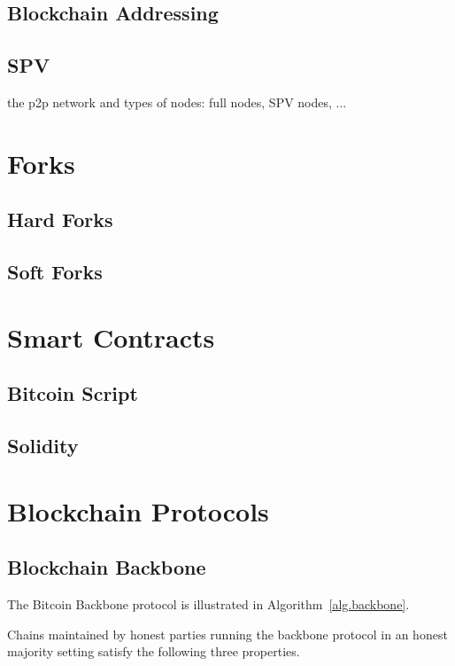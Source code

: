 \subsection{Blockchain Addressing}
\subsection{SPV}
the p2p network and types of nodes: full nodes, SPV nodes, ...

\section{Forks}
\subsection{Hard Forks}
\subsection{Soft Forks}

\section{Smart Contracts}
\subsection{Bitcoin Script}
\subsection{Solidity}


\section{Blockchain Protocols}

\subsection{Blockchain Backbone}

\cite{backbone,pass-asynchronous,varbackbone}

The Bitcoin Backbone protocol is illustrated in Algorithm~\ref{alg.backbone}.




Chains maintained by honest parties running the backbone protocol in an honest
majority setting satisfy the following three properties.

